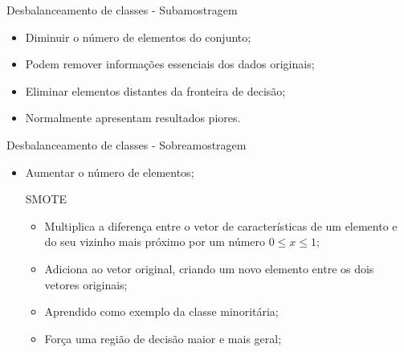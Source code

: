 \documentclass{beamer}
\begin{document}
\begin{frame}{Desbalanceamento de classes - Subamostragem}
\setlength\leftmargini{0em}
\justifying
    \begin{itemize}
        \item Diminuir o número de elementos do conjunto;
        \item Podem remover informações essenciais dos dados originais;
        \item Eliminar elementos distantes da fronteira de decisão;
        \item Normalmente apresentam resultados piores.
    \end{itemize}
\end{frame}
\begin{frame}{Desbalanceamento de classes - Sobreamostragem}
\setlength\leftmargini{0em}
\justifying
    \begin{itemize}
        \item Aumentar o número de elementos;
    \begin{block}{SMOTE}
\setlength\leftmargini{1em}
        \begin{itemize}
            \item Multiplica a diferença entre o vetor de características de um elemento e do seu vizinho mais próximo por um número $0 \leq x \leq 1$;
            \item Adiciona ao vetor original, criando um novo elemento entre os dois vetores originais;
            \item Aprendido como exemplo da classe minoritária;
            \item Força uma região de decisão maior e mais geral;
        \end{itemize}
    \end{block}
    \end{itemize}
\end{frame}
\end{document}
